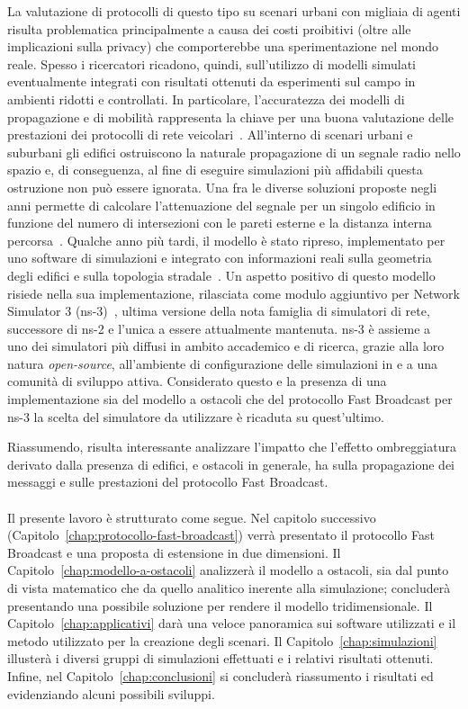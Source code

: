 La valutazione di protocolli di questo tipo su scenari urbani con migliaia di agenti risulta
problematica principalmente a causa dei costi proibitivi (oltre alle implicazioni sulla privacy)
che comporterebbe una sperimentazione nel mondo reale.
Spesso i ricercatori ricadono, quindi, sull'utilizzo di modelli simulati eventualmente integrati con risultati ottenuti
da esperimenti sul campo in ambienti ridotti e controllati.
In particolare, l'accuratezza dei modelli di propagazione e di mobilità rappresenta la chiave per una buona valutazione delle prestazioni
dei protocolli di rete veicolari~\cite{4020783}.
All'interno di scenari urbani e suburbani gli edifici ostruiscono la naturale propagazione di un segnale radio nello spazio
e, di conseguenza, al fine di eseguire simulazioni più affidabili questa ostruzione non può essere ignorata.
Una fra le diverse soluzioni proposte negli anni permette di calcolare l'attenuazione del segnale per un singolo edificio
in funzione del numero di intersezioni con le pareti esterne e la distanza interna percorsa~\cite{5720204}.
Qualche anno più tardi, il modello è stato ripreso, implementato per uno software di simulazioni
e integrato con informazioni reali sulla geometria degli edifici e sulla topologia stradale~\cite{Carpenter:2015:OMI:2756509.2756512}.
Un aspetto positivo di questo modello risiede nella sua implementazione, rilasciata
come modulo aggiuntivo per Network Simulator 3 (ns-3)~\cite{ns3Website},
ultima versione della nota famiglia di simulatori di rete, successore di ns-2
e l'unica a essere attualmente mantenuta.
ns-3 è assieme a \omnet~\cite{omnetWebsite} uno dei simulatori più diffusi
in ambito accademico e di ricerca, grazie alla loro natura \textit{open-source},
all'ambiente di configurazione delle simulazioni in \Cpp{} e a una comunità di sviluppo attiva.
Considerato questo e la presenza di una implementazione sia del modello a ostacoli
che del protocollo Fast Broadcast per ns-3 la scelta del simulatore da utilizzare
è ricaduta su quest'ultimo.

Riassumendo, risulta interessante analizzare l'impatto che l'effetto ombreggiatura derivato dalla
presenza di edifici, e ostacoli in generale, ha sulla propagazione dei messaggi e
sulle prestazioni del protocollo Fast Broadcast. %
%
\paragraph{}
Il presente lavoro è strutturato come segue.
Nel capitolo successivo (Capitolo~\ref{chap:protocollo-fast-broadcast}) verrà presentato il protocollo Fast Broadcast e una proposta di estensione in due dimensioni.
Il Capitolo~\ref{chap:modello-a-ostacoli} analizzerà il modello a ostacoli, sia dal punto di vista matematico che da quello analitico inerente alla simulazione;
concluderà presentando una possibile soluzione per rendere il modello tridimensionale.
Il Capitolo~\ref{chap:applicativi} darà una veloce panoramica sui software utilizzati e il metodo utilizzato per la creazione degli scenari.
Il Capitolo~\ref{chap:simulazioni} illusterà i diversi gruppi di simulazioni effettuati e i relativi risultati ottenuti.
Infine, nel Capitolo~\ref{chap:conclusioni}
si concluderà riassumento i risultati ed evidenziando alcuni possibili sviluppi.
%
